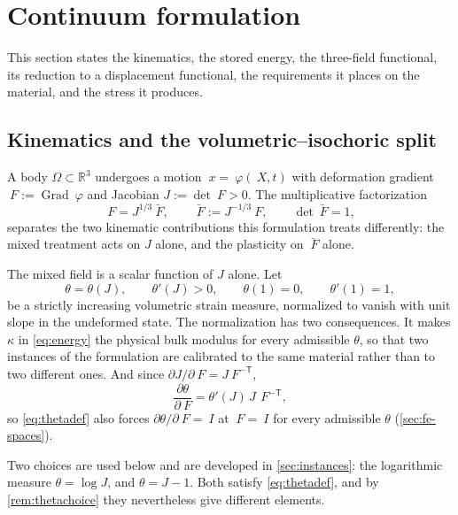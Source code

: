 \documentclass{article}
\newcommand{\F}{~F}
\newcommand{\Id}{~I}
\newcommand{\disp}{~\varphi}
\newcommand{\bx}{~x}
\newcommand{\bX}{~X}
\newcommand{\Reals}{\mathbb{R}}
\newcommand{\Grad}{\operatorname{Grad}}
\theoremstyle{definition}
\theoremstyle{plain}
\begin{document}
\section{Continuum formulation}
\label{sec:continuum}

This section states the kinematics, the stored energy, the three-field
functional, its reduction to a displacement functional, the requirements it
places on the material, and the stress it produces.

\subsection{Kinematics and the volumetric--isochoric split}
\label{sec:kinematics}

A body $\Omega \subset \Reals^3$ undergoes a motion $\bx = \disp(\bX, t)$ with
deformation gradient $\F := \Grad\disp$ and Jacobian $J := \det\F > 0$. The
multiplicative factorization
\begin{equation}
  \label{eq:isosplit}
  \F = J^{1/3}\bar{\F},
  \qquad
  \bar{\F} := J^{-1/3}\F,
  \qquad
  \det\bar{\F} = 1,
\end{equation}
separates the two kinematic contributions this formulation treats differently:
the mixed treatment acts on $J$ alone, and the plasticity on $\bar{\F}$ alone.

The mixed field is a scalar function of $J$ alone. Let
\begin{equation}
  \label{eq:thetadef}
  \theta = \theta(J),
  \qquad \theta'(J) > 0,
  \qquad \theta(1) = 0,
  \qquad \theta'(1) = 1,
\end{equation}
be a strictly increasing volumetric strain measure, normalized to vanish with
unit slope in the undeformed state. The normalization has two consequences. It
makes $\kappa$ in \eqref{eq:energy} the physical bulk modulus for every
admissible $\theta$, so that two instances of the formulation are calibrated to
the same material rather than to two different ones. And since
$\partial J/\partial\F = J\F^{-\mathsf T}$,
\begin{equation}
  \label{eq:dtheta}
  \frac{\partial\theta}{\partial\F} = \theta'(J)\, J\, \F^{-\mathsf T},
\end{equation}
so \eqref{eq:thetadef} also forces $\partial\theta/\partial\F = \Id$ at
$\F = \Id$ for every admissible $\theta$ (\cref{sec:fe-spaces}).

Two choices are used below and are developed in \cref{sec:instances}: the
logarithmic measure $\theta = \log J$, and $\theta = J - 1$. Both satisfy
\eqref{eq:thetadef}, and by \cref{rem:thetachoice} they nevertheless give
different elements.
\end{document}
